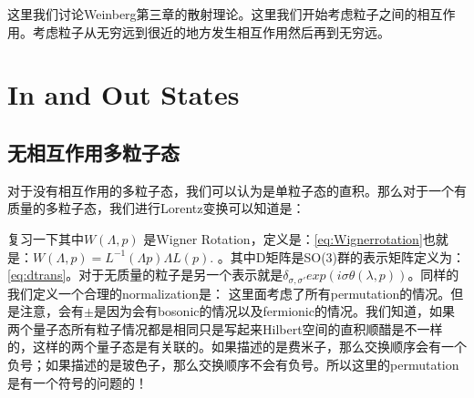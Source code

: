 这里我们讨论Weinberg第三章的散射理论。这里我们开始考虑粒子之间的相互作用。考虑粒子从无穷远到很近的地方发生相互作用然后再到无穷远。

\section{In and Out States}

\subsection{无相互作用多粒子态}
对于没有相互作用的多粒子态，我们可以认为是单粒子态的直积。那么对于一个有质量的多粒子态，我们进行Lorentz变换可以知道是：



复习一下其中$ W(\Lambda,p) $ 是Wigner Rotation，定义是：\cref{eq:Wignerrotation}也就是：$ W(\Lambda,p)=L^{-1}(\Lambda p)\Lambda L(p). $ 。其中D矩阵是SO(3)群的表示矩阵定义为：\cref{eq:dtrans}。对于无质量的粒子是另一个表示就是$ \delta_{\sigma,\sigma'} exp(i \sigma \theta(\lambda,p))$。同样的我们定义一个合理的normalization是：
这里面考虑了所有permutation的情况。但是注意，会有$ \pm $是因为会有bosonic的情况以及fermionic的情况。我们知道，如果两个量子态所有粒子情况都是相同只是写起来Hilbert空间的直积顺醋是不一样的，这样的两个量子态是有关联的。如果描述的是费米子，那么交换顺序会有一个负号；如果描述的是玻色子，那么交换顺序不会有负号。所以这里的permutation是有一个符号的问题的！


